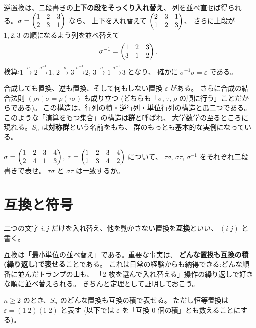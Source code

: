 \begin{rei}[逆置換の求め方]\label{rei:perm-inverse}
逆置換は、二段書きの\textbf{上下の段をそっくり入れ替え}、
列を並べ直せば得られる。$\sigma = \begin{pmatrix}1 & 2 & 3 \\ 2 & 3 & 1\end{pmatrix}$ なら、
上下を入れ替えて $\begin{pmatrix}2 & 3 & 1 \\ 1 & 2 & 3\end{pmatrix}$、
さらに上段が $1, 2, 3$ の順になるよう列を並べ替えて
\[
\sigma^{-1} = \begin{pmatrix}1 & 2 & 3 \\ 3 & 1 & 2\end{pmatrix}.
\]
検算:$1 \xrightarrow{\sigma} 2 \xrightarrow{\sigma^{-1}} 1$,
$2 \xrightarrow{\sigma} 3 \xrightarrow{\sigma^{-1}} 2$,
$3 \xrightarrow{\sigma} 1 \xrightarrow{\sigma^{-1}} 3$ となり、
確かに $\sigma^{-1}\sigma = \varepsilon$ である。
\end{rei}

合成しても置換、逆も置換、そして何もしない置換 $\varepsilon$ がある。
さらに合成の結合法則 $(\rho\tau)\sigma = \rho(\tau\sigma)$ も成り立つ
(どちらも「$\sigma$, $\tau$, $\rho$ の順に行う」ことだからである)。
この構造は、行列の積・逆行列・単位行列の構造と瓜二つである。
このような「演算をもつ集合」の構造は\textbf{群}と呼ばれ、
大学数学の至るところに現れる。$S_n$ は\textbf{対称群}という名前をもち、
群のもっとも基本的な実例になっている。

\begin{mondai}\label{q:perm-comp}
$\sigma = \begin{pmatrix}1 & 2 & 3 & 4 \\ 2 & 4 & 1 & 3\end{pmatrix}$,
$\tau = \begin{pmatrix}1 & 2 & 3 & 4 \\ 1 & 3 & 4 & 2\end{pmatrix}$ について、
$\tau\sigma$, $\sigma\tau$, $\sigma^{-1}$ をそれぞれ二段書きで表せ。
$\tau\sigma$ と $\sigma\tau$ は一致するか。
\end{mondai}

\section{互換と符号}

\begin{teigi}[互換]
二つの文字 $i, j$ だけを入れ替え、他を動かさない置換を\textbf{互換}といい、
$(i \; j)$ と書く。
\end{teigi}

互換は「最小単位の並べ替え」である。重要な事実は、
\textbf{どんな置換も互換の積(繰り返し)で表せる}ことである。
これは日常の経験からも納得できる:どんな順番に並んだトランプの山も、
「$2$ 枚を選んで入れ替える」操作の繰り返しで好きな順に並べ替えられる。
きちんと定理として証明しておこう。

\begin{teiri}[互換分解の存在]\label{thm:perm-decomp}
$n \ge 2$ のとき、$S_n$ のどんな置換も互換の積で表せる。
ただし恒等置換は $\varepsilon = (1\;2)(1\;2)$ と表す
(以下では $\varepsilon$ を「互換 $0$ 個の積」とも数えることにする)。
\end{teiri}

